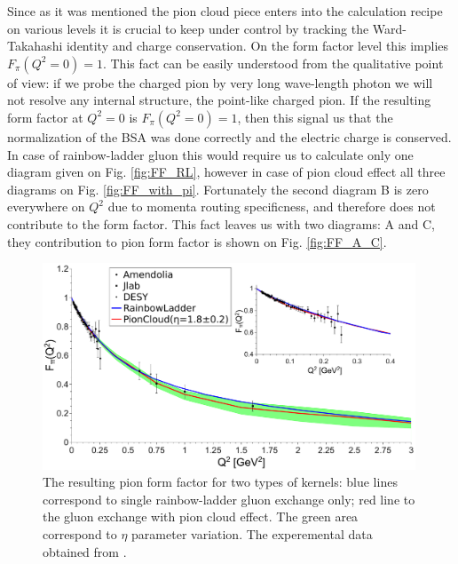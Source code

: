 Since as it was mentioned the pion cloud piece enters into the calculation recipe on various levels it is crucial to keep under control by tracking the Ward-Takahashi identity and charge conservation. On the form factor level this implies $F_\pi(Q^2=0)=1$. This fact can be easily understood from the qualitative point of view: if we probe the charged pion by very long wave-length photon we will not resolve any internal structure, the point-like charged pion. If the resulting form factor at $Q^2=0$ is $F_\pi(Q^2=0)=1$, then this signal us that the normalization of the BSA was done
correctly and the electric charge is conserved. In case of rainbow-ladder gluon this would require us to calculate only one diagram given on Fig. \ref{fig:FF_RL}, however in case of pion cloud effect all three diagrams on Fig. \ref{fig:FF_with_pi}. Fortunately the second diagram B is zero everywhere on $Q^2$ due to momenta routing specificness, and therefore does not contribute to the form factor. This fact leaves us with two diagrams: A and C, they contribution to pion form factor is shown on Fig. \ref{fig:FF_A_C}.
\begin{figure}[h]
\centering
\includegraphics[width=0.99\textwidth]{figures/FF_RL_PS}
\caption{\label{fig:FF_RL_PS}\footnotesize The resulting pion form factor for two types of kernels: blue lines correspond to single rainbow-ladder gluon exchange only; red line to the gluon exchange with pion cloud effect. The green area correspond to $\eta$ parameter variation. The experemental data obtained from \cite{Amendolia:1986wj,Volmer:2000ek}.}
\end{figure} \\

